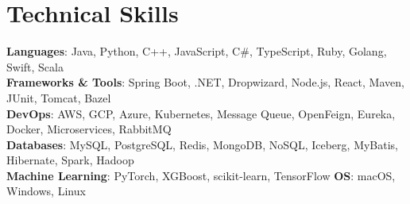 \documentclass[letterpaper,11pt]{article}
\begin{document}
\section{Technical Skills}
 \begin{itemize}[leftmargin=0.15in, label={}]
    \small{\item{
\textbf{Languages}{: Java, Python, C++, JavaScript, C\#, TypeScript, Ruby, Golang, Swift, Scala} \\
\textbf{Frameworks \& Tools}{: Spring Boot, .NET, Dropwizard, Node.js, React, Maven, JUnit, Tomcat, Bazel} \\
\textbf{DevOps}{: AWS, GCP, Azure, Kubernetes, Message Queue, OpenFeign, Eureka, Docker, Microservices, RabbitMQ} \\
\textbf{Databases}{: MySQL, PostgreSQL, Redis, MongoDB, NoSQL, Iceberg, MyBatis, Hibernate, Spark, Hadoop} \\
\textbf{Machine Learning}{: PyTorch, XGBoost, scikit-learn, TensorFlow} \hspace{5pt} \textbf{OS}{: macOS, Windows, Linux}
    }}
 \end{itemize}


\end{document}
